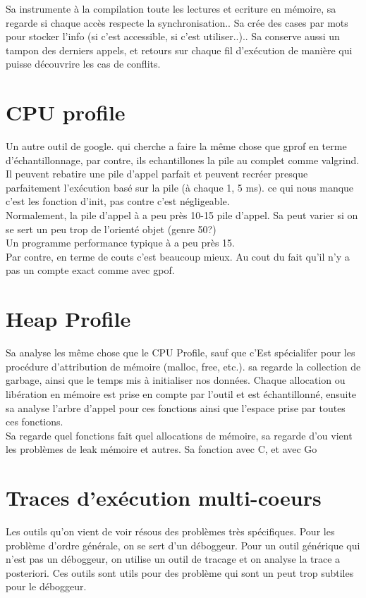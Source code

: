 \documentclass[oneside]{book}
\begin{document}
Sa instrumente à la compilation toute les lectures et ecriture en mémoire, sa regarde si chaque accès respecte la synchronisation.. Sa crée des cases par mots pour stocker l'info (si c'est accessible, si c'est utiliser..).. Sa conserve aussi un tampon des derniers appels, et retours sur chaque fil d'exécution de manière qui puisse découvrire les cas de conflits.\\

\section{CPU profile}
Un autre outil de google. qui cherche a faire la même chose que gprof en terme d'échantillonnage, par contre, ils echantillones la pile au complet comme valgrind. Il peuvent rebatire une pile d'appel parfait et peuvent recréer presque parfaitement l'exécution basé sur la pile (à chaque 1, 5 ms). ce qui nous manque c'est les fonction d'init, pas contre c'est négligeable.\\

Normalement, la pile d'appel à a peu près 10-15 pile d'appel. Sa peut varier si on se sert un peu trop de l'orienté objet (genre 50?)\\

Un programme performance typique à a peu près 15.\\

Par contre, en terme de couts c'est beaucoup mieux. Au cout du fait qu'il n'y a pas un compte exact comme avec gpof.

\section{Heap Profile}
Sa analyse les même chose que le CPU Profile, sauf que c'Est spécialifer pour les procédure d'attribution de mémoire (malloc, free, etc.). sa regarde la collection de garbage, ainsi que le temps mis à initialiser nos données. Chaque allocation ou libération en mémoire est prise en compte par l'outil et est échantillonné, ensuite sa analyse l'arbre d'appel pour ces fonctions ainsi que l'espace prise par toutes ces fonctions.\\

Sa regarde quel fonctions fait quel allocations de mémoire, sa regarde d'ou vient les problèmes de leak mémoire et autres. Sa fonction avec C, et avec Go

\section{Traces d'exécution multi-coeurs}
Les outils qu'on vient de voir résous des problèmes très spécifiques. Pour les problème d'ordre générale, on se sert d'un déboggeur. Pour un outil générique qui n'est pas un déboggeur, on utilise un outil de tracage et on analyse la trace a posteriori. Ces outils sont utils pour des problème qui sont un peut trop subtiles pour le déboggeur.\\
\end{document}
